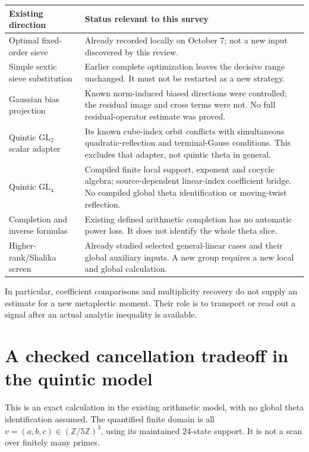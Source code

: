 \documentclass[11pt]{article}
\newcommand{\toprule}{\hline}
\newcommand{\midrule}{\hline}
\newcommand{\bottomrule}{\hline}
\newcommand{\ZZ}{\mathbb Z}
\newcommand{\GL}{\mathrm{GL}}
\begin{document}
\begin{center}
\begin{tabular}{p{4.1cm}p{9.7cm}}
\toprule
Existing direction & Status relevant to this survey\\
\midrule
Optimal fixed-order sieve & Already recorded locally on October 7;
not a new input discovered by this review.\\
Simple sextic sieve substitution & Earlier complete optimization leaves
the decisive range unchanged. It must not be restarted as a new strategy.\\
Gaussian bias projection & Known norm-induced biased directions were
controlled; the residual image and cross terms were not.
No full residual-operator estimate was proved.\\
Quintic $\GL_2$ scalar adapter & Its known cube-index orbit conflicts
with simultaneous quadratic-reflection and terminal-Gauss conditions.
This excludes that adapter, not quintic theta in general.\\
Quintic $\GL_4$ & Compiled finite local support, exponent and cocycle
algebra; source-dependent linear-index coefficient bridge.
No compiled global theta identification or moving-twist reflection.\\
Completion and inverse formulas & Existing defined arithmetic completion
has no automatic power loss. It does not identify the whole theta slice.\\
Higher-rank/Shalika screen & Already studied selected general-linear
cases and their global auxiliary inputs. A new group requires a new
local and global calculation.\\
\bottomrule
\end{tabular}
\end{center}

In particular, coefficient comparisons and multiplicity recovery do not
supply an estimate for a new metaplectic moment. Their role is to transport
or read out a signal after an actual analytic inequality is available.

\section{A checked cancellation tradeoff in the quintic model}

This is an exact calculation in the existing arithmetic model, with no
global theta identification assumed. The quantified finite domain is
all $v=(a,b,c)\in(\ZZ/5\ZZ)^3$, using its maintained 24-state support.
It is not a scan over finitely many primes.
\end{document}
